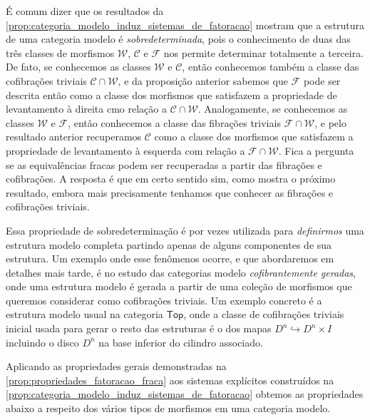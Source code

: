 \begin{obs}
  É comum dizer que os resultados da \cref{prop:categoria_modelo_induz_sistemas_de_fatoracao} mostram que a estrutura de uma categoria modelo é \emph{sobredeterminada}, pois o conhecimento de duas das três classes de morfismos $\mathcal{W}$, $\mathcal{C}$ e $\mathcal{F}$ nos permite determinar totalmente a terceira.
  De fato, se conhecemos as classes $\mathcal{W}$ e $\mathcal{C}$, então conhecemos também a classe das cofibrações triviais $\mathcal{C} \cap \mathcal{W}$, e da proposição anterior sabemos que $\mathcal{F}$ pode ser descrita então como a classe dos morfismos que satisfazem a propriedade de levantamento à direita cmo relação a $\mathcal{C} \cap \mathcal{W}$.
  Analogamente, se conhecemos as classes $\mathcal{W}$ e $\mathcal{F}$, então conhecemos a classe das fibrações triviais $\mathcal{F} \cap \mathcal{W}$, e pelo resultado anterior recuperamos $\mathcal{C}$ como a classe dos morfismos que satisfazem a propriedade de levantamento à esquerda com relação a $\mathcal{F} \cap \mathcal{W}$.
  Fica a pergunta se as equivalências fracas podem ser recuperadas a partir das fibrações e cofibrações.
  A resposta é que em certo sentido sim, como mostra o próximo resultado, embora mais precisamente tenhamos que conhecer as fibrações e cofibrações triviais.

  Essa propriedade de sobredeterminação é por vezes utilizada para \emph{definirmos} uma estrutura modelo completa partindo apenas de alguns componentes de sua estrutura.
  Um exemplo onde esse fenômenos ocorre, e que abordaremos em detalhes mais tarde, é no estudo das categorias modelo \emph{cofibrantemente geradas}, onde uma estrutura modelo é gerada a partir de uma coleção de morfismos que queremos considerar como cofibrações triviais.
  Um exemplo concreto é a estrutura modelo usual na categoria $\mathsf{Top}$, onde a classe de cofibrações triviais inicial usada para gerar o resto das estruturas é o dos mapas $D^{n} \hookrightarrow D^{n} \times I$ incluindo o disco $D^{n}$ na base inferior do cilindro associado.
\end{obs}

Aplicando as propriedades gerais demonstradas na \cref{prop:propriedades_fatoracao_fraca} aos sistemas explícitos construídos na \cref{prop:categoria_modelo_induz_sistemas_de_fatoracao} obtemos as propriedades abaixo a respeito dos vários tipos de morfismos em uma categoria modelo.

